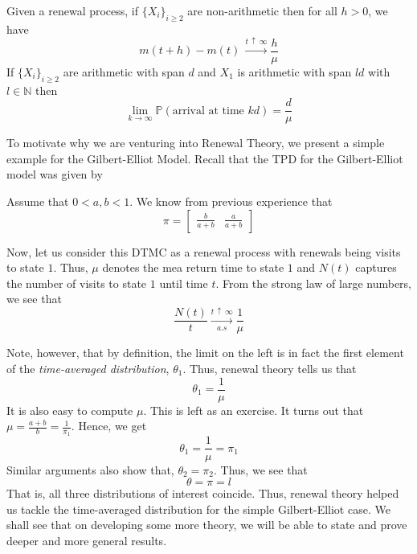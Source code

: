 \documentclass[12pt]{article}
\def\P{\mathbb{P}}
\theoremstyle{definition}
\begin{document}
\begin{thm} \label{thm:brt}
    Given a renewal process, if $\{X_i\}_{i \geq 2}$ are non-arithmetic then for all $h > 0$, we have
    \[
        m(t+h) - m(t) \, \xrightarrow[]{t \, \uparrow \, \infty} \frac{h}{\mu}
    \]  
    If $\{X_i\}_{i \geq 2}$ are arithmetic with span $d$ and $X_1$ is arithmetic with span $ld$ with $l \in \mathbb{N}$ then
    \[
        \lim_{k \to \infty} \P \left( \text{arrival at time $kd$} \right) = \frac{d}{\mu}
    \]      
\end{thm}

To motivate why we are venturing into Renewal Theory, we present a simple example for the Gilbert-Elliot Model. Recall that the TPD for the Gilbert-Elliot model was given by

\begin{center}
\end{center}


Assume that $0 < a,b < 1$. We know from previous experience that
\[
    \pi = \begin{bmatrix}
        \frac{b}{a+b} & \frac{a}{a+b}
    \end{bmatrix}
\]

Now, let us consider this DTMC as a renewal process with renewals being visits to state $1$. Thus, $\mu$ denotes the mea return time to state $1$ and $N(t)$ captures the number of visits to state $1$ until time $t$. From the strong law of large numbers, we see that
\[
    \frac{N(t)}{t} \xrightarrow[a.s]{t \, \uparrow \, \infty} \frac{1}{\mu}
\]

Note, however, that by definition, the limit on the left is in fact the first element of the \emph{time-averaged distribution}, $\theta_1$. Thus, renewal theory tells us that
\[
    \theta_1 = \frac{1}{\mu}
\]
It is also easy to compute $\mu$. This is left as an exercise. It turns out that $\mu = \frac{a+b}{b} = \frac{1}{\pi_1}$. Hence, we get
\[
    \theta_1 = \frac{1}{\mu} = \pi_1
\]
Similar arguments also show that, $\theta_2 = \pi_2$. Thus, we see that
\[
    \theta = \pi = l
\]
That is, all three distributions of interest coincide. Thus, renewal theory helped us tackle the time-averaged distribution for the simple Gilbert-Elliot case. We shall see that on developing some more theory, we will be able to state and prove deeper and more general results. 
\end{document}

